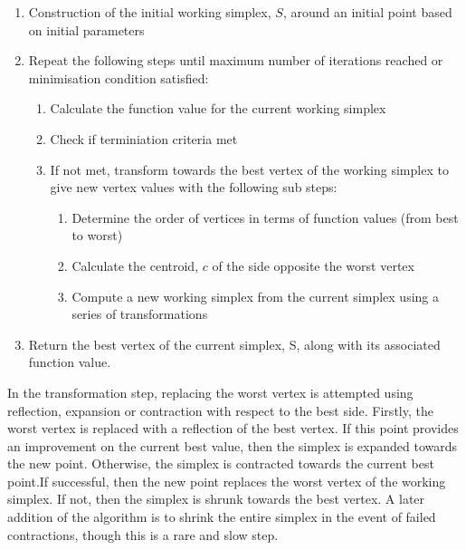 \documentclass[11pt, a4paper, oneside,titlepage]{article}
\begin{document}
\begin{framed}
\begin{enumerate}
\item Construction of the initial working simplex, $S$, around an initial
  point based on initial parameters
\item Repeat the following steps until maximum number of iterations
  reached or minimisation condition satisfied:
  \begin{enumerate}
  \item Calculate the function value for the current working simplex
  \item Check if terminiation criteria met
  \item If not met, transform towards the best vertex of the working simplex to give new
    vertex values with the following sub steps:
    \begin{enumerate}
      \item Determine the order of vertices in terms of function
        values (from best to worst)
        \item Calculate the centroid, $c$ of the side opposite the
          worst vertex
\item Compute a new working simplex from the current simplex using a
  series of transformations
\end{enumerate}
  \end{enumerate}
\item Return the best vertex of the current simplex, S, along with
  its associated function value.
\end{enumerate}

In the transformation step, replacing the worst vertex is attempted
using reflection, expansion or contraction with respect to the best
side. Firstly, the worst vertex is replaced with a reflection of the
best vertex. If this point provides an improvement on the current best
value, then the simplex is expanded towards the new point. Otherwise,
the simplex is contracted towards the current best point.If
successful, then the new point replaces the worst vertex of the
working simplex. If not, then the simplex is shrunk towards the best
vertex. A later addition of the algorithm is to shrink the entire
simplex in the event of failed contractions, though this is a rare and
slow step.


\end{framed}
\end{document}
